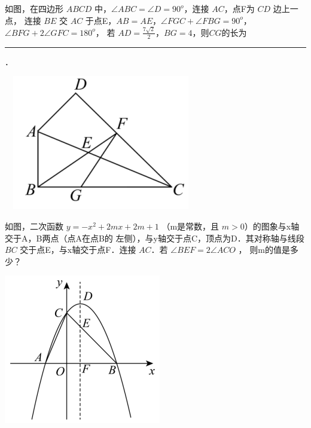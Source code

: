 \documentclass[12pt, a4paper, addpoints]{exam} %
\begin{document}
\vspace{10pt}



\begingroup{} %

\begin{questions}


\question[10] 如图，在四边形 $ABCD$ 中，$\angle{ABC}=\angle{D}=90^{o}$，连接 $AC$，点F为 $CD$ 边上一点，
连接 $BE$ 交 $AC$ 于点E，$AB=AE$，$\angle{FGC}+\angle{FBG}=90^{o}$，$\angle{BFG}+2\angle{GFC}=180^{o}$，
若 $AD=\frac{7\sqrt{2}}{2}$，$BG=4$，则$CG$的长为 \rule{3cm}{0.4pt}．

\ \ 
\includegraphics[scale=1]{2222.png}
\vspace{6cm}




\question[15] 如图，二次函数 $y=-x^2+2mx+2m+1 $ （m是常数，且 $m>0$）的图象与x轴交于A，B两点（点A在点B的
左侧），与y轴交于点C，顶点为D．其对称轴与线段 $BC$ 交于点E，与x轴交于点F．连接 $AC$．若 $\angle{BEF}=2\angle{ACO}$ ，
则m的值是多少？

\includegraphics[scale=1]{1111.png}
\vspace{6cm}


\end{questions}
\endgroup
\end{document}
